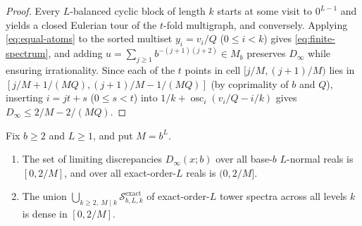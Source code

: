 \documentclass[11pt]{article}
\begin{document}
\begin{proof}
Every $L$-balanced cyclic block of length $k$ starts at some visit to $0^{L-1}$ and yields a closed Eulerian tour of the $t$-fold multigraph, and conversely. Applying \eqref{eq:equal-atoms} to the sorted multiset $y_i=v_i/Q$ ($0\le i<k$) gives \eqref{eq:finite-spectrum}, and adding $u=\sum_{j\ge1}b^{-(j+1)(j+2)}\in M_b$ preserves $D_\infty$ while ensuring irrationality. Since each of the $t$ points in cell $[j/M,(j+1)/M)$ lies in $[j/M+1/(MQ),(j+1)/M-1/(MQ)]$ (by coprimality of $b$ and $Q$), inserting $i=jt+s$ ($0\le s<t$) into $1/k+\operatorname{osc}_i(v_i/Q-i/k)$ gives $D_\infty\le 2/M-2/(MQ)$.
\end{proof}

\begin{theorem}\label{thm:real-spectrum}
Fix $b\ge2$ and $L\ge1$, and put $M=b^L$.
\begin{enumerate}[label=\textup{(\roman*)},nosep]
\item The set of limiting discrepancies $D_\infty(x;b)$ over all base-$b$ $L$-normal reals is $[0,2/M]$, and over all exact-order-$L$ reals is $(0,2/M]$.
\item The union $\bigcup_{k\ge2,\ M\mid k}\mathcal S_{b,L,k}^{\mathrm{exact}}$ of exact-order-$L$ tower spectra across all levels $k$ is dense in $[0,2/M]$.
\end{enumerate}
\end{theorem}
\end{document}
